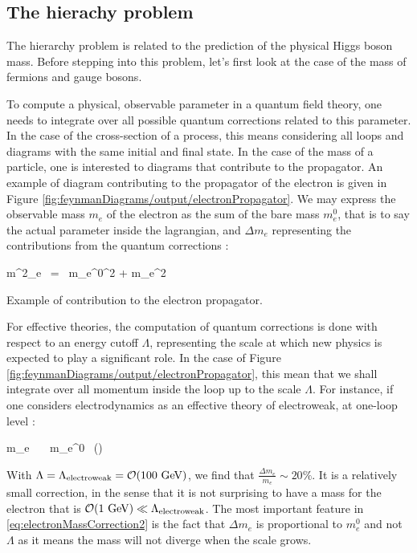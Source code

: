         \subsection{The hierachy problem}

    The hierarchy problem is related to the prediction of the physical Higgs boson mass.
    Before stepping into this problem, let's first look at the case of the mass of fermions
    and gauge bosons.

    To compute a physical, observable parameter in a quantum field theory, one needs to
    integrate over all possible quantum corrections related to this parameter. In the case
    of the cross-section of a process, this means considering all loops and diagrams
    with the same initial and final state. In the case of the mass of a particle, one is
    interested to diagrams that contribute to the propagator. An example of diagram contributing
    to the propagator of the electron is given in Figure \ref{fig:feynmanDiagrams/output/electronPropagator}. We may
    express the observable mass $m_e$ of the electron as the sum of the bare mass $m^0_{e}$,
    that is to say the actual parameter inside the lagrangian, and $\Delta m_e$ representing
    the contributions from the quantum corrections :

    {
        m^2_e \, = \, {m_e^0}^2 + \Delta m_e^2
    }

                 {Example of contribution to the electron propagator.}

    For effective theories, the computation of quantum corrections is done with respect to
    an energy cutoff $\Lambda$, representing the scale at which new physics is expected
    to play a significant role. In the case of Figure \ref{fig:feynmanDiagrams/output/electronPropagator}, this mean
    that we shall integrate over all momentum inside the loop up to the scale $\Lambda$.
    For instance, if one considers electrodynamics as an effective theory of electroweak,
    at one-loop level :

    {
        \Delta m_e \, \simeq \, \frac{\alpha}{4\pi} \, m_e^0 \, \left(\right)
    }

    With $\Lambda = \Lambda_{\text{electroweak}} = \mathcal{O}(100~\text{GeV})$, we find that
    $\frac{\Delta m_e}{m_e} \sim 20\%$. It is a relatively small correction, in the sense
    that it is not surprising to have a mass for the electron that is $\mathcal{O}(1~\text{GeV}) \ll \Lambda_{\text{electroweak}}$.
    The most important feature in \ref{eq:electronMassCorrection2} is the fact that $\Delta m_e$
    is proportional to $m_e^0$ and not $\Lambda$ as it means the mass will not diverge
    when the scale grows.

